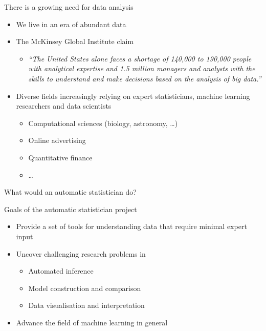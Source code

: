 \begin{frame}{There is a growing need for data analysis}
  \begin{itemize}
    \item We live in an era of abundant data
    \vspace{\baselineskip}
    \item The McKinsey Global Institute claim
    \begin{itemize}
      \item \emph{``The United States alone faces a shortage of 140,000 to 190,000 people with analytical expertise and 1.5 million managers and analysts with the skills to understand and make decisions based on the analysis of big data.''}
    \end{itemize}
    \vspace{\baselineskip}
    \item Diverse fields increasingly relying on expert statisticians, machine learning researchers and data scientists \eg
    \begin{itemize}
       \item Computational sciences (\eg biology, astronomy, \ldots)
       \item Online advertising
       \item Quantitative finance
       \item \ldots
     \end{itemize}
  \end{itemize}
\end{frame}

\begin{frame}{What would an automatic statistician do?}
  
\end{frame}

\begin{frame}{Goals of the automatic statistician project}
  \begin{itemize}
    \item Provide a set of tools for understanding data that require minimal expert input
    \vspace{\baselineskip}
    \item Uncover challenging research problems in \eg
    \begin{itemize}
      \item Automated inference
      \item Model construction and comparison
      \item Data visualisation and interpretation
    \end{itemize}
    \vspace{\baselineskip}
    \item Advance the field of machine learning in general
    \vspace{\baselineskip}
  \end{itemize}
\end{frame}

